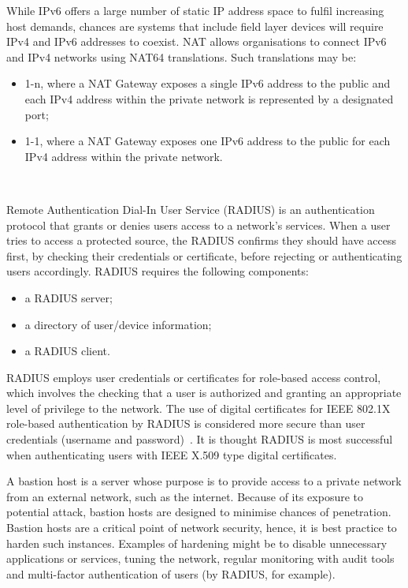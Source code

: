 \documentclass[11pt, oneside]{article}   	%
\begin{document}
While IPv6 offers a large number of static IP address space to fulfil increasing host demands, chances are systems that include field layer devices will require IPv4 and IPv6 addresses to coexist.
NAT allows organisations to connect IPv6 and IPv4 networks using NAT64 translations. Such translations may be:
\begin{itemize}
	\item 1-n, where a NAT Gateway exposes a single IPv6 address to the public and each IPv4 address within the private network is represented by a designated port; 
	\item 1-1, where a NAT Gateway exposes one IPv6 address to the public for each IPv4 address within the private network.
\end{itemize}\

Remote Authentication Dial-In User Service (RADIUS) is an authentication protocol that grants or denies users access to a network’s services.
When a user tries to access a protected source, the RADIUS confirms they should have access first, by checking their credentials or certificate, before rejecting or authenticating users accordingly.
RADIUS requires the following components:
\begin{itemize}
	\item a RADIUS server; 
	\item a directory of user/device information;
	\item a RADIUS client.
\end{itemize}	
RADIUS employs user credentials or certificates for role-based access control, which involves the checking that a user is authorized and granting an appropriate level of privilege to the network.
The use of digital certificates for IEEE 802.1X role-based authentication by RADIUS is considered more secure than user credentials (username and password)~\cite{8021X}.
It is thought RADIUS is most successful when authenticating users with IEEE X.509 type digital certificates.~\cite{X509}\

A bastion host is a server whose purpose is to provide access to a private network from an external network, such as the internet.
Because of its exposure to potential attack, bastion hosts are designed to minimise chances of penetration.
Bastion hosts are a critical point of network security, hence, it is best practice to harden such instances.
Examples of hardening might be to disable unnecessary applications or services, tuning the network, regular monitoring with audit tools and multi-factor authentication of users (by RADIUS, for example).\
\end{document}

